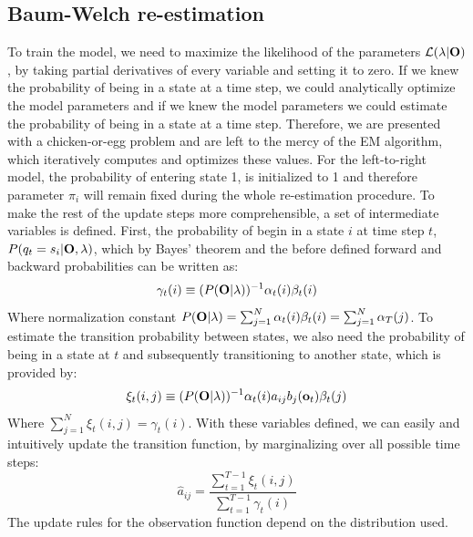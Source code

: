 \documentclass[conference]{IEEEtran}
\begin{document}
\subsection{Baum-Welch re-estimation}
To train the model, we need to maximize the likelihood of the parameters $\mathcal{L}(\lambda|{\bf O})$, by taking partial derivatives of every variable and setting it to zero. If we knew the probability of being in a state at a time step, we could analytically optimize the model parameters and if we knew the model parameters we could estimate the probability of being in a state at a time step. Therefore, we are presented with a chicken-or-egg problem and are left to the mercy of the EM algorithm, which iteratively computes and optimizes these values. For the left-to-right model, the probability of entering state 1, is initialized to 1 and therefore parameter $\pi_{i}$ will remain fixed during the whole re-estimation procedure. To make the rest of the update steps more comprehensible, a set of intermediate variables is defined. First, the probability of begin in a state $i$ at time step $t$, $P(q_{t} = s_{i} | {\bf O}, \lambda )$, which by Bayes' theorem and the before defined forward and backward probabilities can be written as:
\begin{equation}
 \gamma_{t}(i) \equiv (P({\bf O}|\lambda))^{-1} \alpha_{t}(i)\beta_{t}(i) 
\end{equation}
Where normalization constant $P({\bf O}|\lambda) = \sum_{j=1}^{N} \alpha_{t}(i)\beta_{t}(i) = \sum_{j=1}^{N} \alpha_{T}(j)$. To estimate the transition probability between states, we also need the probability of being in a state at $t$ and subsequently transitioning to another state, which is provided by:
\begin{equation}
 \xi_{t}(i,j) \equiv (P({\bf O}|\lambda))^{-1} \alpha_{t}(i)a_{ij}b_{j}({\bf o}_{t})\beta_{t}(j)
\end{equation}
Where $\sum_{j=1}^{N} \xi_{t}(i,j) = \gamma_{t}(i)$. With these variables defined, we can easily and intuitively update the transition function, by marginalizing over all possible time steps:
\begin{equation}
 \hat{a}_{ij} = \frac{ \sum_{t=1}^{T-1} \xi_{t}(i,j) } { \sum_{t=1}^{T-1} \gamma_{t}(i) }
\end{equation}
The update rules for the observation function depend on the distribution used.
\end{document}
